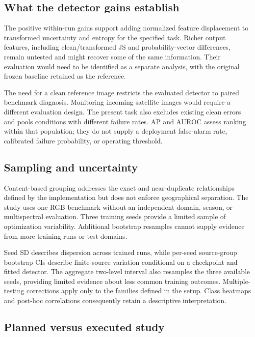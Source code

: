 \subsection{What the detector gains establish}

The positive within-run gains support adding normalized feature displacement to transformed uncertainty and entropy for the specified task. Richer output features, including clean/transformed JS and probability-vector differences, remain untested and might recover some of the same information. Their evaluation would need to be identified as a separate analysis, with the original frozen baseline retained as the reference.

The need for a clean reference image restricts the evaluated detector to paired benchmark diagnosis. Monitoring incoming satellite images would require a different evaluation design. The present task also excludes existing clean errors and pools conditions with different failure rates. AP and AUROC assess ranking within that population; they do not supply a deployment false-alarm rate, calibrated failure probability, or operating threshold.

\subsection{Sampling and uncertainty}

Content-based grouping addresses the exact and near-duplicate relationships defined by the implementation but does not enforce geographical separation. The study uses one RGB benchmark without an independent domain, season, or multispectral evaluation. Three training seeds provide a limited sample of optimization variability. Additional bootstrap resamples cannot supply evidence from more training runs or test domains.

Seed SD describes dispersion across trained runs, while per-seed source-group bootstrap CIs describe finite-source variation conditional on a checkpoint and fitted detector. The aggregate two-level interval also resamples the three available seeds, providing limited evidence about less common training outcomes. Multiple-testing corrections apply only to the families defined in the setup. Class heatmaps and post-hoc correlations consequently retain a descriptive interpretation.

\subsection{Planned versus executed study}

